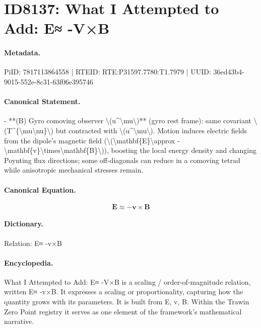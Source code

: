 \section*{ID8137: What I Attempted to Add: E≈ -V×B}
\paragraph{Metadata.}
PiID: 7817113864558 | RTEID: RTE:P31597.7780:T1.7979 | UUID: 36ed43b4-9015-552e-8c31-63f06e395746

\paragraph{Canonical Statement.}
- **(B) Gyro comoving observer \textbackslash{}(u\textasciicircum{}\textbackslash{}mu\textbackslash{})** (gyro rest frame): same covariant \textbackslash{}(T\textasciicircum{}\{\textbackslash{}mu\textbackslash{}nu\}\textbackslash{}) but contracted with \textbackslash{}(u\textasciicircum{}\textbackslash{}mu\textbackslash{}). Motion induces electric fields from the dipole’s magnetic field (\textbackslash{}(\textbackslash{}mathbf\{E\}\textbackslash{}approx -\textbackslash{}mathbf\{v\}\textbackslash{}times\textbackslash{}mathbf\{B\}\textbackslash{})), boosting the local energy density and changing Poynting flux directions; some off-diagonals can reduce in a comoving tetrad while anisotropic mechanical stresses remain.

\paragraph{Canonical Equation.}
\[
\mathbf{E}\approx -\mathbf{v}\times\mathbf{B}
\]

\paragraph{Dictionary.}
Relation: E≈ -v×B

\paragraph{Encyclopedia.}
What I Attempted to Add: E≈ -V×B is a scaling / order-of-magnitude relation, written E≈ -v×B. It expresses a scaling or proportionality, capturing how the quantity grows with its parameters. It is built from E, v, B. Within the Trawin Zero Point registry it serves as one element of the framework's mathematical narrative.
